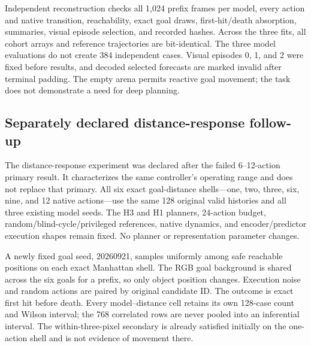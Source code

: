 Independent reconstruction checks all 1,024 prefix frames per model, every action and native
transition, reachability, exact goal draws, first-hit/death absorption, summaries, visual episode
selection, and recorded hashes. Across the three fits, all cohort arrays and reference trajectories
are bit-identical. The three model evaluations do not create 384 independent cases. Visual episodes
0, 1, and 2 were fixed before results, and decoded selected forecasts are marked invalid after
terminal padding. The empty arena permits reactive goal movement; the task does not demonstrate
a need for deep planning.

\begin{table}[ht]
\centering
\caption{\textbf{The original distant-goal test remains a weak result.} Initial goals are six
to 12 native actions away. The same 128 goals and histories are used for all three models and references.
Distances are mean L1 pixels over all cases; lower is better. Random, blind-cycle, and privileged
reference trajectories are shared across model evaluations.}
\label{tab:redcube-goals}
\end{table}

\subsection{Separately declared distance-response follow-up}
\label{app:redcube-distance}
The distance-response experiment was declared after the failed 6--12-action primary result. It
characterizes the same controller's operating range and does not replace that primary. All six
exact goal-distance shells---one, two, three, six, nine, and 12 native actions---use the same 128
original valid histories and all three existing model seeds. The H3 and H1 planners, 24-action
budget, random/blind-cycle/privileged references, native dynamics, and encoder/predictor execution
shapes remain fixed. No planner or representation parameter changes.

A newly fixed goal seed, 20260921, samples uniformly among safe reachable positions on each exact
Manhattan shell. The RGB goal background is shared across the six goals for a prefix, so only
object position changes. Execution noise and random actions are paired by original candidate ID.
The outcome is exact first hit before death. Every model--distance cell retains its own 128-case
count and Wilson interval; the 768 correlated rows are never pooled into an inferential interval.
The within-three-pixel secondary is already satisfied initially on the one-action shell and is
not evidence of movement there.

